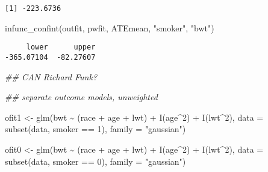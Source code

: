 \documentclass[
  letterpaper,
  DIV=11,
  numbers=noendperiod]{scrartcl}
\newenvironment{Shaded}{\begin{snugshade}}{\end{snugshade}}
\newcommand{\AttributeTok}[1]{\textcolor[rgb]{0.40,0.45,0.13}{#1}}
\newcommand{\DecValTok}[1]{\textcolor[rgb]{0.68,0.00,0.00}{#1}}
\newcommand{\DocumentationTok}[1]{\textcolor[rgb]{0.37,0.37,0.37}{\textit{#1}}}
\newcommand{\FunctionTok}[1]{\textcolor[rgb]{0.28,0.35,0.67}{#1}}
\newcommand{\NormalTok}[1]{\textcolor[rgb]{0.00,0.23,0.31}{#1}}
\newcommand{\OtherTok}[1]{\textcolor[rgb]{0.00,0.23,0.31}{#1}}
\newcommand{\SpecialCharTok}[1]{\textcolor[rgb]{0.37,0.37,0.37}{#1}}
\newcommand{\StringTok}[1]{\textcolor[rgb]{0.13,0.47,0.30}{#1}}
\begin{document}
\begin{verbatim}
[1] -223.6736
\end{verbatim}

\begin{Shaded}
\begin{Highlighting}[]
\FunctionTok{infunc\_confint}\NormalTok{(outfit, pwfit, ATEmean, }\StringTok{"smoker"}\NormalTok{, }\StringTok{"bwt"}\NormalTok{)}
\end{Highlighting}
\end{Shaded}

\begin{verbatim}
     lower      upper 
-365.07104  -82.27607 
\end{verbatim}

\begin{Shaded}
\begin{Highlighting}[]
\DocumentationTok{\#\# CAN Richard Funk?}

\DocumentationTok{\#\# separate outcome models, unweighted}

\NormalTok{ofit1 }\OtherTok{\textless{}{-}} \FunctionTok{glm}\NormalTok{(bwt }\SpecialCharTok{\textasciitilde{}}\NormalTok{ (race }\SpecialCharTok{+}\NormalTok{ age }\SpecialCharTok{+}\NormalTok{ lwt) }\SpecialCharTok{+} \FunctionTok{I}\NormalTok{(age}\SpecialCharTok{\^{}}\DecValTok{2}\NormalTok{) }\SpecialCharTok{+} \FunctionTok{I}\NormalTok{(lwt}\SpecialCharTok{\^{}}\DecValTok{2}\NormalTok{), }
              \AttributeTok{data =} \FunctionTok{subset}\NormalTok{(data, smoker }\SpecialCharTok{==} \DecValTok{1}\NormalTok{), }\AttributeTok{family =} \StringTok{"gaussian"}\NormalTok{)}

\NormalTok{ofit0 }\OtherTok{\textless{}{-}} \FunctionTok{glm}\NormalTok{(bwt }\SpecialCharTok{\textasciitilde{}}\NormalTok{ (race }\SpecialCharTok{+}\NormalTok{ age }\SpecialCharTok{+}\NormalTok{ lwt) }\SpecialCharTok{+} \FunctionTok{I}\NormalTok{(age}\SpecialCharTok{\^{}}\DecValTok{2}\NormalTok{) }\SpecialCharTok{+} \FunctionTok{I}\NormalTok{(lwt}\SpecialCharTok{\^{}}\DecValTok{2}\NormalTok{), }
              \AttributeTok{data =} \FunctionTok{subset}\NormalTok{(data, smoker }\SpecialCharTok{==} \DecValTok{0}\NormalTok{), }\AttributeTok{family =} \StringTok{"gaussian"}\NormalTok{)}



\end{Highlighting}
\end{Shaded}
\end{document}
